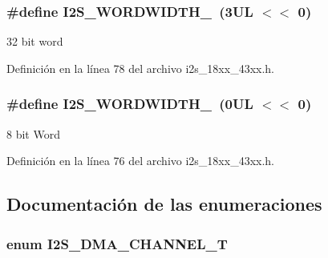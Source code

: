 \subsubsection[{\texorpdfstring{I2\+S\+\_\+\+W\+O\+R\+D\+W\+I\+D\+T\+H\+\_\+32}{I2S_WORDWIDTH_32}}]{\setlength{\rightskip}{0pt plus 5cm}\#define I2\+S\+\_\+\+W\+O\+R\+D\+W\+I\+D\+T\+H\+\_~(3\+U\+L $<$$<$ 0)}\hypertarget{group___i2_s__18_x_x__43_x_x_ga683d81436e91c1631bdd5947ee78489b}{}\label{group___i2_s__18_x_x__43_x_x_ga683d81436e91c1631bdd5947ee78489b}
32 bit word 

Definición en la línea 78 del archivo i2s\+\_\+18xx\+\_\+43xx.\+h.

\subsubsection[{\texorpdfstring{I2\+S\+\_\+\+W\+O\+R\+D\+W\+I\+D\+T\+H\+\_\+8}{I2S_WORDWIDTH_8}}]{\setlength{\rightskip}{0pt plus 5cm}\#define I2\+S\+\_\+\+W\+O\+R\+D\+W\+I\+D\+T\+H\+\_~(0\+U\+L $<$$<$ 0)}\hypertarget{group___i2_s__18_x_x__43_x_x_ga17cb1a91d5be4e7afad486ead6d2980d}{}\label{group___i2_s__18_x_x__43_x_x_ga17cb1a91d5be4e7afad486ead6d2980d}
8 bit Word 

Definición en la línea 76 del archivo i2s\+\_\+18xx\+\_\+43xx.\+h.



\subsection{Documentación de las enumeraciones}
\subsubsection[{\texorpdfstring{I2\+S\+\_\+\+D\+M\+A\+\_\+\+C\+H\+A\+N\+N\+E\+L\+\_\+T}{I2S_DMA_CHANNEL_T}}]{\setlength{\rightskip}{0pt plus 5cm}enum {\bf I2\+S\+\_\+\+D\+M\+A\+\_\+\+C\+H\+A\+N\+N\+E\+L\+\_\+T}}\hypertarget{group___i2_s__18_x_x__43_x_x_gac04c1583101ddd661886d9677683421b}{}\label{group___i2_s__18_x_x__43_x_x_gac04c1583101ddd661886d9677683421b}


